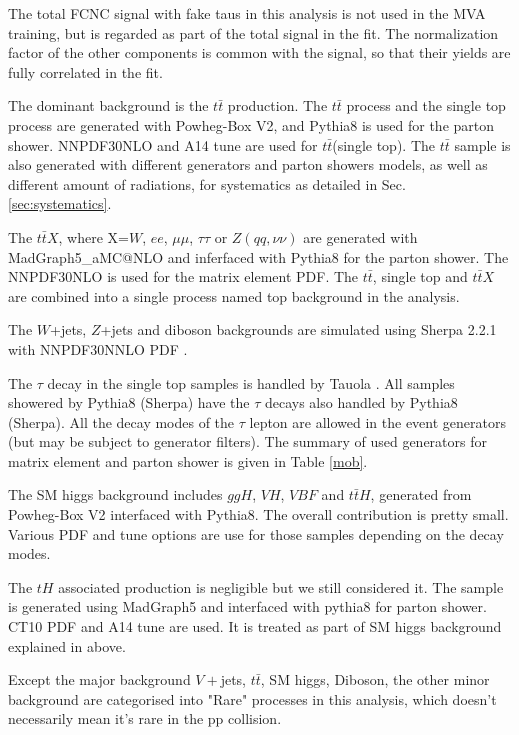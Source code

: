 The total FCNC signal with fake taus in this analysis is not used in the MVA training, but is regarded as part of the total signal in the fit. The normalization factor of the other components is common with the signal, so that their yields are fully correlated in the fit.

The dominant background is the $t\bar{t}$ production. The $t\bar{t}$ process and the single top process are generated with Powheg-Box \cite{Powheg} V2, and Pythia8 is used for the parton shower. NNPDF30NLO \cite{NNPDF30NLO} and A14 tune \cite{A14} are used for $t\bar{t}$(single top). The $t\bar{t}$ sample is also generated with different generators and parton showers models, as well as different amount of radiations, for systematics as detailed in Sec. \ref{sec:systematics}.

The $t\bar{t}X$, where X=$W$, $ee$, $\mu\mu$, $\tau\tau$ or $Z(qq,\nu\nu)$ are generated with MadGraph5\_aMC@NLO and inferfaced with Pythia8 for the parton shower. The NNPDF30NLO \cite{NNPDF30NLO} is used for the matrix element PDF. The $t\bar{t}$, single top and $t\bar{t}X$ are combined into a single process named top background in the analysis.

The $W$+jets, $Z$+jets and diboson backgrounds are simulated using Sherpa 2.2.1 \cite{Sherpa} with NNPDF30NNLO PDF \cite{NNPDF30NLO}.

The $\tau$ decay in the single top samples is handled by Tauola \cite{Tauola}. All samples showered by Pythia8 (Sherpa) have the $\tau$ decays also handled by Pythia8 (Sherpa). All the decay modes of the $\tau$ lepton are allowed in the event generators (but may be subject to generator filters). The summary of used generators for matrix element and parton shower is given in Table \ref{mob}.

The SM higgs background includes $ggH$, $VH$, $VBF$ and $t\bar{t}H$, generated from Powheg-Box \cite{Powheg} V2 interfaced with Pythia8. The overall contribution is pretty small. Various PDF and tune options are use for those samples depending on the decay modes.

The $tH$ associated production is negligible but we still considered it. The sample is generated using MadGraph5 and interfaced with pythia8 for parton shower. CT10 PDF and A14 tune are used. It is treated as part of SM higgs background explained in above.

Except the major background $V+$jets, $t\bar{t}$, SM higgs, Diboson, the other minor background are categorised into "Rare" processes in this analysis, which doesn't necessarily mean it's rare in the pp collision.

